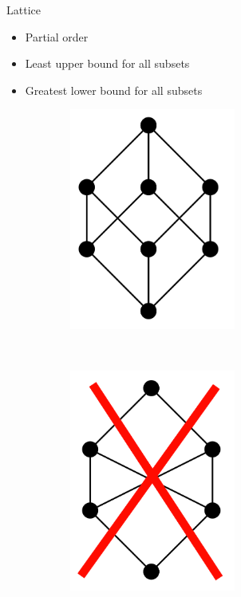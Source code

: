 \begin{frame}{Lattice}
  \begin{itemize}
  \item Partial order 
  \item Least upper bound for all subsets
  \item Greatest lower bound for all subsets
  \end{itemize}


  \begin{figure}
    \begin{subfigure}[b]{0.4\textwidth}
      \includegraphics[width=0.6\textwidth]{graphics/lattice}
    \end{subfigure}
    ~
    \begin{subfigure}[b]{0.4\textwidth}
      \includegraphics[width=0.6\textwidth]{graphics/definitelynotlattice}
    \end{subfigure}    
  \end{figure}
\end{frame}
